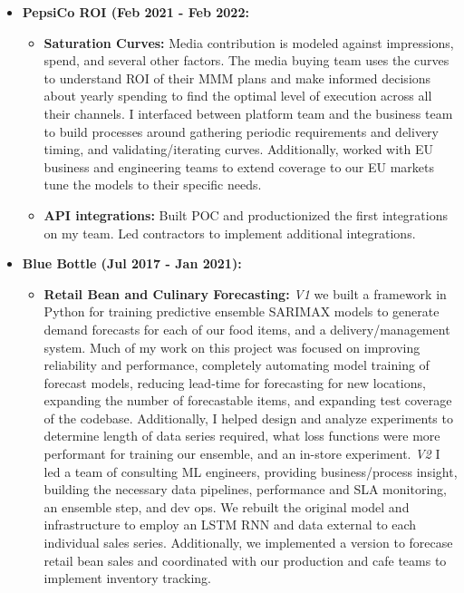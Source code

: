\documentclass[a4paper,10pt,notitlepage]{article}
\begin{document}
    \begin{itemize}
        \vspace{-5pt}\item \textbf{PepsiCo ROI (Feb 2021 - Feb 2022:}
            \begin{itemize}
                    \item \textbf{Saturation Curves:} Media contribution is modeled against impressions, spend, and several other factors. The media buying team uses the curves to understand ROI of their MMM plans and make informed decisions about yearly spending to find the optimal level of execution across all their channels. I interfaced between platform team and the business team to build processes around gathering periodic requirements and delivery timing, and validating/iterating curves. Additionally, worked with EU business and engineering teams to extend coverage to our EU markets tune the models to their specific needs.
                    \item \textbf{API integrations:} Built POC and productionized the first integrations on my team. Led contractors to implement additional integrations.
            \end{itemize}
        \vspace{-5pt}\item \textbf{Blue Bottle (Jul 2017 - Jan 2021):}
            \begin{itemize}
                    \item \textbf{Retail Bean and Culinary Forecasting:} \emph{V1} we built a framework in Python for training predictive ensemble SARIMAX models to generate demand forecasts for each of our food items, and a delivery/management system. Much of my work on this project was focused on improving reliability and performance, completely automating model training of forecast models, reducing lead-time for forecasting for new locations, expanding the number of forecastable items, and expanding test coverage of the codebase. Additionally, I helped design and analyze experiments to determine length of data series required, what loss functions were more performant for training our ensemble, and an in-store experiment. \emph{V2} I led a team of consulting ML engineers, providing business/process insight, building the necessary data pipelines, performance and SLA monitoring, an ensemble step, and dev ops. We rebuilt the original model and infrastructure to employ an LSTM RNN and data external to each individual sales series. Additionally, we implemented a version to forecase retail bean sales and coordinated with our production and cafe teams to implement inventory tracking.

\end{itemize}
\end{itemize}
\end{document}
